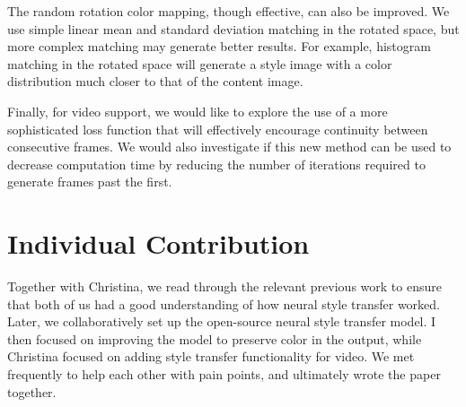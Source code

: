 \documentclass[10pt,twocolumn,letterpaper]{article}
\begin{document}
The random rotation color mapping, though effective, can also be improved. We use simple linear mean and standard deviation matching in the rotated space, but more complex matching may generate better results. For example, histogram matching in the rotated space will generate a style image with a color distribution much closer to that of the content image.

Finally, for video support, we would like to explore the use of a more sophisticated loss function that will effectively encourage continuity between consecutive frames. We would also investigate if this new method can be used to decrease computation time by reducing the number of iterations required to generate frames past the first.

\section{Individual Contribution}
Together with Christina, we read through the relevant previous work to ensure that both of us had a good understanding of how neural style transfer worked. Later, we collaboratively set up the open-source neural style transfer model. I then focused on improving the model to preserve color in the output, while Christina focused on adding style transfer functionality for video. We met frequently to help each other with pain points, and ultimately wrote the paper together.

{\small


}
\end{document}
